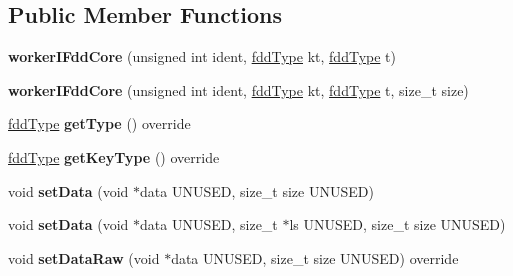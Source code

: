 \subsection*{Public Member Functions}
\begin{DoxyCompactItemize}
\item 
\hypertarget{classfaster_1_1workerIFddCore_a4870d516ed4bef37adc17746b74ec267}{}\label{classfaster_1_1workerIFddCore_a4870d516ed4bef37adc17746b74ec267} 
{\bfseries worker\+I\+Fdd\+Core} (unsigned int ident, \hyperlink{namespacefaster_aa8898687bc64536b60a3d5f365060cd6}{fdd\+Type} kt, \hyperlink{namespacefaster_aa8898687bc64536b60a3d5f365060cd6}{fdd\+Type} t)
\item 
\hypertarget{classfaster_1_1workerIFddCore_a5e7e471ccfa11ee3e3b5a287d6512f2f}{}\label{classfaster_1_1workerIFddCore_a5e7e471ccfa11ee3e3b5a287d6512f2f} 
{\bfseries worker\+I\+Fdd\+Core} (unsigned int ident, \hyperlink{namespacefaster_aa8898687bc64536b60a3d5f365060cd6}{fdd\+Type} kt, \hyperlink{namespacefaster_aa8898687bc64536b60a3d5f365060cd6}{fdd\+Type} t, size\+\_\+t size)
\item 
\hypertarget{classfaster_1_1workerIFddCore_af389368c2a1761b958c8e08336864b92}{}\label{classfaster_1_1workerIFddCore_af389368c2a1761b958c8e08336864b92} 
\hyperlink{namespacefaster_aa8898687bc64536b60a3d5f365060cd6}{fdd\+Type} {\bfseries get\+Type} () override
\item 
\hypertarget{classfaster_1_1workerIFddCore_a5db1be64cd268995e0ca456b5407510d}{}\label{classfaster_1_1workerIFddCore_a5db1be64cd268995e0ca456b5407510d} 
\hyperlink{namespacefaster_aa8898687bc64536b60a3d5f365060cd6}{fdd\+Type} {\bfseries get\+Key\+Type} () override
\item 
\hypertarget{classfaster_1_1workerIFddCore_a3effbc1108e2778555e63f655cdac4d9}{}\label{classfaster_1_1workerIFddCore_a3effbc1108e2778555e63f655cdac4d9} 
void {\bfseries set\+Data} (void $\ast$data U\+N\+U\+S\+ED, size\+\_\+t size U\+N\+U\+S\+ED)
\item 
\hypertarget{classfaster_1_1workerIFddCore_a1fda790a0244ace7fbf02f5d291eae1c}{}\label{classfaster_1_1workerIFddCore_a1fda790a0244ace7fbf02f5d291eae1c} 
void {\bfseries set\+Data} (void $\ast$data U\+N\+U\+S\+ED, size\+\_\+t $\ast$ls U\+N\+U\+S\+ED, size\+\_\+t size U\+N\+U\+S\+ED)
\item 
\hypertarget{classfaster_1_1workerIFddCore_ae8c350a472d39e564e1b5a9ebfdf0500}{}\label{classfaster_1_1workerIFddCore_ae8c350a472d39e564e1b5a9ebfdf0500} 
void {\bfseries set\+Data\+Raw} (void $\ast$data U\+N\+U\+S\+ED, size\+\_\+t size U\+N\+U\+S\+ED) override

\end{DoxyCompactItemize}
